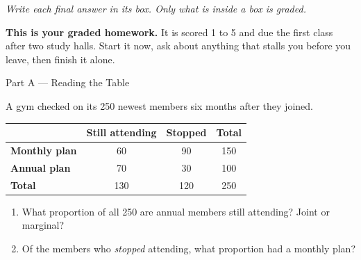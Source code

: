 \documentclass[12pt]{article}
\newcommand{\answerspace}[2]{\par\nopagebreak\noindent\begin{minipage}[t][#1][t]{\linewidth}%
  \color{keyred}\bfseries #2\end{minipage}\par}
\begin{document}
{\small\itshape Write each final answer in its box. Only what is inside a box is graded.}\par

\vspace{0.06in}

\boxguard[8]
\begin{remindbox}
\small
\textbf{This is your graded homework.} It is scored 1 to 5 and due the first class after two study
halls. Start it now, ask about anything that stalls you before you leave, then finish it alone.
\end{remindbox}

\vspace{0.04in}

\boxguard[20]
\begin{notesbox}{Part A --- Reading the Table}
\small
\begin{minipage}[c]{0.34\linewidth}\raggedright
A gym checked on its 250 newest members six months after they joined.
\end{minipage}\hfill
\begin{minipage}[c]{0.64\linewidth}
\centering
\renewcommand{\arraystretch}{1.1}
\begin{tabular}{@{} l | c c | c @{}}
 & \textbf{Still attending} & \textbf{Stopped} & \textbf{Total} \\ \hline
\textbf{Monthly plan} & 60 & 90 & 150 \\
\textbf{Annual plan} & 70 & 30 & 100 \\ \hline
\textbf{Total} & 130 & 120 & 250 \\
\end{tabular}
\end{minipage}
\vspace{2pt}
\begin{enumerate}[leftmargin=1.9em, itemsep=2pt]
  \item What proportion of all 250 are annual members still attending? Joint or marginal?
        \answerspace{0.7cm}{}
  \item Of the members who \emph{stopped} attending, what proportion had a monthly plan?\gradedbelow[r]{5pt}{\gradedblank[id=hw2, type=short, points=1, answer=0.75, check=numeric, tolerance=0.005]{0.7in}{0.2in}}
        \answerspace{0.7cm}{}
\end{enumerate}
\end{notesbox}
\end{document}
